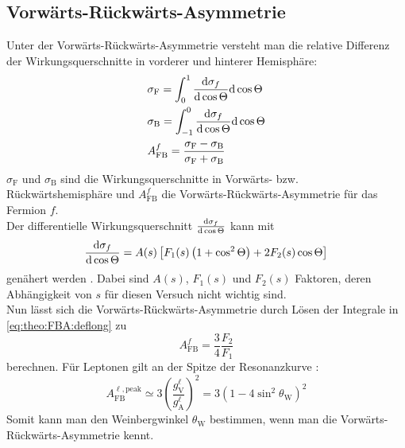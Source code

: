 \subsection{Vorwärts-Rückwärts-Asymmetrie}
Unter der Vorwärts-Rückwärts-Asymmetrie versteht man die relative Differenz der Wirkungsquerschnitte in vorderer und hinterer Hemisphäre:
\begin{equation}
    \label{eq:theo:FBA:deflong}
    \begin{split}
        & \sigma_\text{F} = \int_0^1 \frac{\mathrm{d} \sigma_f}{\mathrm{d} \cos \Theta} \mathrm{d} \cos \Theta \\
        & \sigma_\text{B} = \int_{-1}^0 \frac{\mathrm{d} \sigma_f}{\mathrm{d} \cos \Theta} \mathrm{d} \cos \Theta \\
        & A_\text{FB}^f = \frac{\sigma_\text{F} - \sigma_\text{B}}{\sigma_\text{F} + \sigma_\text{B}}
    \end{split}
\end{equation}
$\sigma_\text{F}$ und $\sigma_\text{B}$ sind die Wirkungsquerschnitte in Vorwärts- bzw. Rückwärtshemisphäre und $A_\text{FB}^f$ die
Vorwärts-Rückwärts-Asymmetrie für das Fermion $f$. \\
Der differentielle Wirkungsquerschnitt $\frac{\mathrm{d} \sigma_f}{\mathrm{d} \cos \Theta}$ kann mit
\begin{equation}
    \frac{\mathrm{d} \sigma_f}{\mathrm{d} \cos \Theta} = A(s) \left[F_1(s) \left( 1 + \cos^2 \Theta \right) + 2 F_2(s) \cos \Theta \right]
\end{equation}
genähert werden \cite{manual}. Dabei sind $A(s)$, $F_1(s)$ und $F_2(s)$ Faktoren,
deren Abhängigkeit von $s$ für diesen Versuch nicht wichtig sind. \\
Nun lässt sich die Vorwärts-Rückwärts-Asymmetrie durch Lösen der Integrale in \autoref{eq:theo:FBA:deflong} zu
\begin{equation}
    A_\text{FB}^f = \frac{3}{4} \frac{F_2}{F_1}
\end{equation}
berechnen. Für Leptonen gilt an der Spitze der Resonanzkurve \cite{manual}:
\begin{equation}
    A_\text{FB}^{\ell, \text{peak}} \simeq 3 \left( \frac{g_\text{V}^\ell}{g_\text{A}^\ell} \right)^2 = 3 \left( 1 - 4 \sin^2 \theta_\text{W} \right)^2
\end{equation}
Somit kann man den Weinbergwinkel $\theta_\text{W}$ bestimmen, wenn man die Vorwärts-Rückwärts-Asymmetrie kennt.
